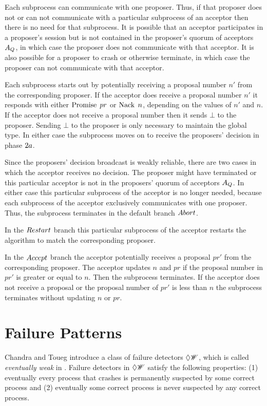 Each subprocess can communicate with one proposer.
Thus, if that proposer does not or can not communicate with a particular subprocess of an acceptor then there is no need for that subprocess.
It is possible that an acceptor participates in a proposer's session but is not contained in the proposer's quorum of acceptors $A_Q$, in which case the proposer does not communicate with that acceptor.
It is also possible for a proposer to crash or otherwise terminate, in which case the proposer can not communicate with that acceptor.

Each subprocess starts out by potentially receiving a proposal number $n'$ from the corresponding proposer.
If the acceptor does receive a proposal number $n'$ it responds with either $\operatorname{Promise}\; pr$ or $\operatorname{Nack}\; n$, depending on the values of $n'$ and $n$.
If the acceptor does not receive a proposal number then it sends $\bot$ to the proposer.
Sending $\bot$ to the proposer is only necessary to maintain the global type.
In either case the subprocess moves on to receive the proposers' decision in phase $2a$.

Since the proposers' decision broadcast is weakly reliable, there are two cases in which the acceptor receives no decision.
The proposer might have terminated or this particular acceptor is not in the proposers' quorum of acceptors $A_Q$.
In either case this particular subprocess of the acceptor is no longer needed, because each subprocess of the acceptor exclusively communicates with one proposer.
Thus, the subprocess terminates in the default branch $\mathnormal{Abort}$.

In the $\mathnormal{Restart}$ branch this particular subprocess of the acceptor restarts the algorithm to match the corresponding proposer.

In the $\mathnormal{Accept}$ branch the acceptor potentially receives a proposal $pr'$ from the corresponding proposer.
The acceptor updates $n$ and $pr$ if the proposal number in $pr'$ is greater or equal to $n$.
Then the subprocess terminates.
If the acceptor does not receive a proposal or the proposal number of $pr'$ is less than $n$ the subprocess terminates without updating $n$ or $pr$.

\section{Failure Patterns}
Chandra and Toueg introduce a class of failure detectors $\Diamond\mathscr{W}$, which is called \emph{eventually weak} in \cite{failure_detectors}.
Failure detectors in $\Diamond\mathscr{W}$ satisfy the following properties: (1) eventually every process that crashes is permanently suspected by some correct process and (2) eventually some correct process is never suspected by any correct process.

